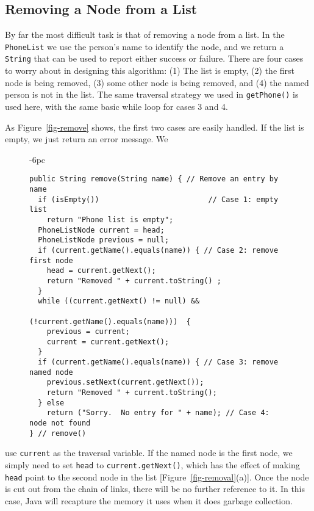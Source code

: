 \subsection*{Removing a Node from a List}

\noindent By far the most difficult task is that of removing a node from a
list.  In the {\tt PhoneList} we use the person's name to identify the
node, and we return a {\tt String} that can be used to report either
success or failure.   There are four cases to worry about in designing
this algorithm: (1) The list is empty, (2) the first node is being
removed, (3) some other node is being removed, and (4) the named person is
not in the list.   The same traversal strategy we used in
{\tt getPhone()} is used here, with the same basic while loop for cases 3
and 4.


As Figure~\ref{fig-remove} shows, the first two cases are
easily handled.  If the list is empty, we just return an error message.  We
\begin{figure}[h!]
\jjjprogstart
\begin{jjjlistingleft}[32pc]{-6pc}
\begin{lstlisting}
public String remove(String name) { // Remove an entry by name
  if (isEmpty())                         // Case 1: empty list
    return "Phone list is empty";
  PhoneListNode current = head;
  PhoneListNode previous = null;
  if (current.getName().equals(name)) { // Case 2: remove first node
    head = current.getNext();
    return "Removed " + current.toString() ;
  }
  while ((current.getNext() != null) && 
                              (!current.getName().equals(name)))  {
    previous = current;
    current = current.getNext();
  }
  if (current.getName().equals(name)) { // Case 3: remove named node
    previous.setNext(current.getNext());
    return "Removed " + current.toString();
  } else
    return ("Sorry.  No entry for " + name); // Case 4: node not found
} // remove()
\end{lstlisting}
\end{jjjlistingleft}
\end{figure}
use {\tt current} as the traversal variable.  If the named node is the
first node, we simply need to set {\tt head} to
{\tt current.getNext()}, which has the effect of making {\tt head} point to
the second node in the list [Figure~\ref{fig-removal}(a)]. Once the node
is cut out from the chain of links, there will be no further reference
to it.  In this case, Java will recapture the memory it uses when it
does garbage collection.

